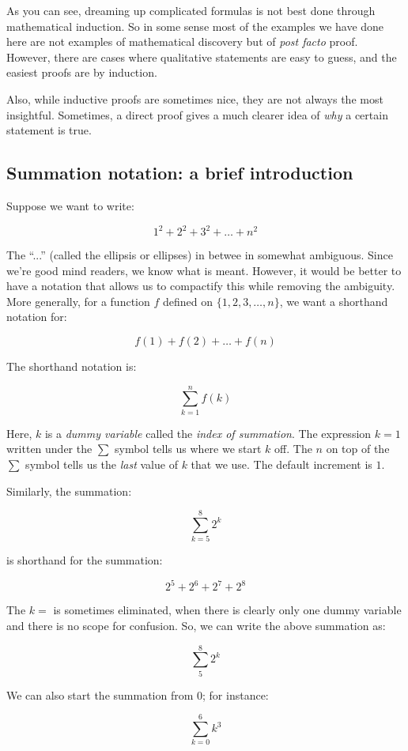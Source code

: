 \documentclass{amsart}
\begin{document}
As you can see, dreaming up complicated formulas is not best done
through mathematical induction. So in some sense most of the examples
we have done here are not examples of mathematical discovery but of
{\em post facto} proof. However, there are cases where qualitative
statements are easy to guess, and the easiest proofs are by induction.

Also, while inductive proofs are sometimes nice, they are not always
the most insightful. Sometimes, a direct proof gives a much clearer
idea of {\em why} a certain statement is true.

\subsection{Summation notation: a brief introduction}

Suppose we want to write:

$$1^2 + 2^2 + 3^2 + \dots + n^2$$

The ``...'' (called the ellipsis or ellipses) in betwee in somewhat
ambiguous. Since we're good mind readers, we know what is
meant. However, it would be better to have a notation that allows us
to compactify this while removing the ambiguity. More generally, for a
function $f$ defined on $\{ 1,2,3, \dots, n\}$, we want a shorthand
notation for:

$$f(1) + f(2) + \dots + f(n)$$

The shorthand notation is:

$$\sum_{k=1}^n f(k)$$

Here, $k$ is a {\em dummy variable} called the {\em index of
summation}. The expression $k = 1$ written under the $\sum$ symbol
tells us where we start $k$ off. The $n$ on top of the $\sum$ symbol
tells us the {\em last} value of $k$ that we use. The default
increment is $1$.

Similarly, the summation:

$$\sum_{k=5}^8 2^k$$

is shorthand for the summation:

$$2^5 + 2^6 + 2^7 + 2^8$$

The $k = $ is sometimes eliminated, when there is clearly only one
dummy variable and there is no scope for confusion. So, we can write
the above summation as:

$$\sum_5^8 2^k$$

We can also start the summation from $0$; for instance:

$$\sum_{k=0}^6 k^3$$
\end{document}

